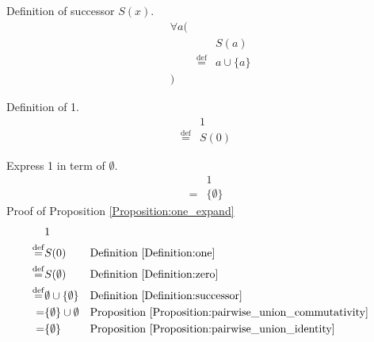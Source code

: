 \begin{defn}
\label{Definition:successor}
Definition of successor $S(x)$.
\begin{align*}
& \forall a ( \\
& & & S(a) \\
& & \overset{\operatorname{def}}{=} & a \cup \{ a \} \\
& )
\end{align*}
\end{defn}

\begin{defn}
\label{Definition:one}
Definition of 1.
\begin{align*}
& 1 \\
\overset{\operatorname{def}}{=} & S(0)
\end{align*}
\end{defn}

\begin{prop}
\label{Proposition:one_expand}
Express 1 in term of $\emptyset$.
\begin{align*}
& 1 \\
= & \{ \emptyset \}
\end{align*}
Proof of Proposition \ref{Proposition:one_expand}
\begin{align*}
& 1 \\
\overset{\operatorname{def}}{=} & S(0)
& & \text{Definition \ref{Definition:one}} \\
\overset{\operatorname{def}}{=} & S(\emptyset)
& & \text{Definition \ref{Definition:zero}} \\
\overset{\operatorname{def}}{=} & \emptyset \cup \{ \emptyset \}
& & \text{Definition \ref{Definition:successor}} \\
= & \{ \emptyset \} \cup \emptyset
& & \text{Proposition \ref{Proposition:pairwise_union_commutativity}} \\
= & \{ \emptyset \}
& & \text{Proposition \ref{Proposition:pairwise_union_identity}} \\
\end{align*}
\end{prop}

